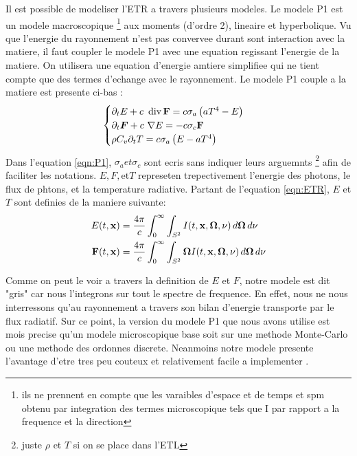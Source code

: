Il est possible de modeliser l'ETR a travers plusieurs modeles. Le modele P1 est un modele macroscopique \footnote{ils ne prennent en compte que les varaibles d'espace et de temps et spm obtenu par integration des termes microscopique tels que I par rapport a la frequence et la direction} aux moments (d'ordre 2), lineaire et hyperbolique. Vu que l'energie du rayonnement n'est pas convervee durant sont interaction avec la matiere, il faut coupler le modele P1 avec une equation regissant l'energie de la matiere. On utilisera une equation d'energie amtiere simplifiee qui ne tient compte que des termes d'echange avec le rayonnement. Le modele P1 couple a la matiere est presente ci-bas \parencite{Reference2}:
\begingroup
\large
\begin{equation}
    \begin{cases}
     \partial_tE + c \ \operatorname {div} \mathbf{F} = c\sigma_a\left(aT^4-E\right)\\
     \partial_t\bm{F} + c \ \nabla E = -c\sigma_c \mathbf{F} \\
     \rho C_v \partial_t T = c \sigma_a \left(E-aT^4\right)
    \end{cases}
\label{eqn:P1}
\end{equation}
\endgroup
Dans l'equation \ref{eqn:P1}, $\sigma_a et \sigma_c$ sont ecris sans indiquer leurs arguemnts \footnote{juste $\rho$ et $T$ si on se place dans l'ETL} afin de faciliter les notations. $E, F, \text{et} T$ represeten trepectivement l'energie des photons, le flux de phtons, et la temperature radiative. Partant de l'equation \ref{eqn:ETR}, $E$ et $T$ sont definies de la maniere suivante:
\begin{align*}
E(t,\mathbf{x}) &= \frac{4\pi}{c} \int_{0}^{\infty} \int_{S^2} I(t,\mathbf{x},\bm{\Omega},\nu) \, d\bm{\Omega} \, d\nu \\
\mathbf{F}(t,\mathbf{x}) &= \frac{4\pi}{c} \int_{0}^{\infty} \int_{S^2} \bm{\Omega}I(t,\mathbf{x},\bm{\Omega},\nu) \, d\bm{\Omega} \, d\nu 
\label{eqn:EFT}
\end{align*}

Comme on peut le voir a travers la definition de $E$ et $F$, notre modele est dit "gris" car nous l'integrons sur tout le spectre de frequence. En effet, nous ne nous interressons qu'au rayonnement a travers son bilan d'energie transporte par le flux radiatif. Sur ce point, la version du modele P1 que nous avons utilise est mois precise qu'un modele microscopique base soit sur une methode Monte-Carlo ou une methode des ordonnes discrete. Neanmoins notre modele presente l'avantage d'etre tres peu couteux et relativement facile a implementer \parencite{Reference3}. 

